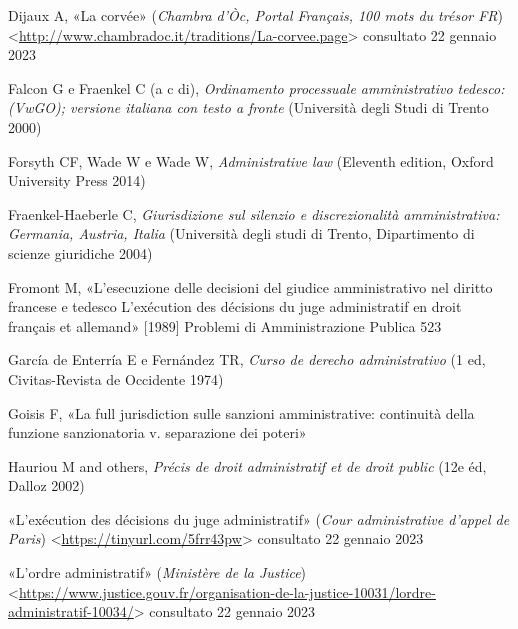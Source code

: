 \documentclass[12pt,it,a4paper,]{report}
\newlength{\cslhangindent}
\newenvironment{CSLReferences}[2] %
 {%
  \setlength{\parindent}{0pt}
  \ifodd #1 \everypar{\setlength{\hangindent}{\cslhangindent}}\ignorespaces\fi
  \ifnum #2 > 0
  \setlength{\parskip}{#2\baselineskip}
  \fi
 }%
 {}
\begin{document}
\begin{CSLReferences}{0}{0}
\leavevmode{}%
Dijaux A, {«La corvée»} (\emph{Chambra d'Òc, Portal Français, 100 mots
du trésor FR})
\textless{}\url{http://www.chambradoc.it/traditions/La-corvee.page}\textgreater{}
consultato 22 gennaio 2023

\leavevmode{}%
Falcon G e Fraenkel C (a c di), \emph{Ordinamento processuale
amministrativo tedesco: (VwGO); versione italiana con testo a fronte}
(Università degli Studi di Trento 2000)

\leavevmode{}%
Forsyth CF, Wade W e Wade W, \emph{Administrative law} (Eleventh
edition, Oxford University Press 2014)

\leavevmode{}%
Fraenkel-Haeberle C, \emph{Giurisdizione sul silenzio e discrezionalità
amministrativa: Germania, Austria, Italia} (Università degli studi di
Trento, Dipartimento di scienze giuridiche 2004)

\leavevmode{}%
Fromont M, {«L'esecuzione delle decisioni del giudice amministrativo nel
diritto francese e tedesco L'exécution des décisions du juge
administratif en droit français et allemand»} {[}1989{]} Problemi di
Amministrazione Publica 523

\leavevmode{}%
García de Enterría E e Fernández TR, \emph{Curso de derecho
administrativo} (1 ed, Civitas-Revista de Occidente 1974)

\leavevmode{}%
Goisis F, {«La full jurisdiction sulle sanzioni amministrative:
continuità della funzione sanzionatoria v. separazione dei poteri»}

\leavevmode{}%
Hauriou M and others, \emph{Précis de droit administratif et de droit
public} (12e éd, Dalloz 2002)

\leavevmode{}%
{«L'exécution des décisions du juge administratif»} (\emph{Cour
administrative d'appel de Paris})
\textless{}\url{https://tinyurl.com/5frr43pw}\textgreater{} consultato
22 gennaio 2023

\leavevmode{}%
{«L'ordre administratif»} (\emph{Ministère de la Justice})
\textless{}\url{https://www.justice.gouv.fr/organisation-de-la-justice-10031/lordre-administratif-10034/}\textgreater{}
consultato 22 gennaio 2023


\end{CSLReferences}
\end{document}
